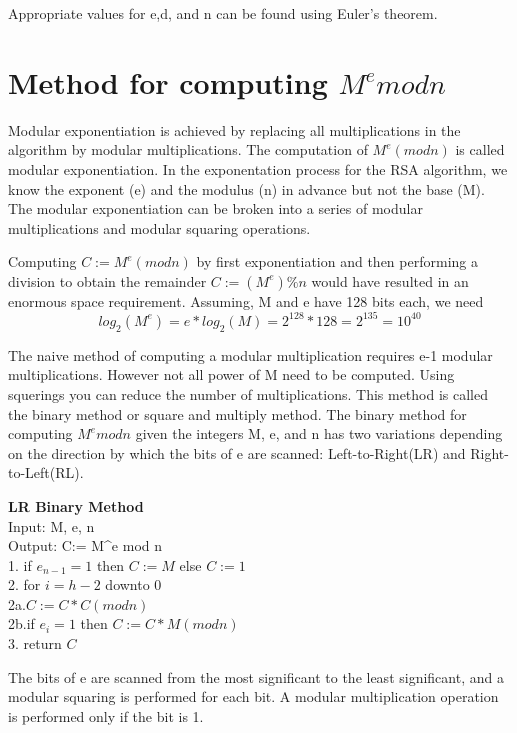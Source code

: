 Appropriate values for e,d, and n can be found using Euler's theorem.


\section{Method for computing $M^emod n$}
Modular exponentiation is achieved by replacing all multiplications in the algorithm by modular multiplications.
The computation of $M^e(mod n)$ is called modular exponentiation. In the exponentation process for the RSA algorithm, we know the exponent (e) and the modulus (n) in advance but not the base (M). 
The modular exponentiation can be broken into a series of modular multiplications and modular squaring operations.

Computing $C:= M^e (mod n)$ by first exponentiation and then performing a division to obtain the remainder $C:=(M^e)\%n $ would have resulted in an enormous space requirement. Assuming, M and e have 128 bits each, we need
\begin{equation}
    log_2(M^e)=e*log_2(M) = 2^{128}*128=2^{135} = 10^{40}
\end{equation}

The naive method of computing a modular multiplication requires e-1 modular multiplications. However not all power of M need to be computed. Using squerings you can reduce the number of multiplications. This method is called the binary method or square and multiply method.
The binary method for computing $M^emodn$ given the integers M, e, and n has two variations depending on the direction by which the bits of e are scanned: Left-to-Right(LR) and Right-to-Left(RL).

\begin{algorithm}
\setAlgoLined
    \textbf{LR Binary Method}\\
    Input: M, e, n\\
    Output: C:= M^e mod n\\
    1. if $e_{n-1}=1$ then $C:=M$ else $C:=1$\\
    2. for $i=h-2$ downto 0\\
    2a.\quad $C:=C * C (mod n)$\\
    2b.\quad if $e_{i}=1$ then $C:=C * M (mod n)$\\
    3. return $C$
\end{algorithm}

The bits of e are scanned from the most significant to the least significant, and a modular squaring is performed for each bit. A modular multiplication operation is performed only if the bit is 1.

